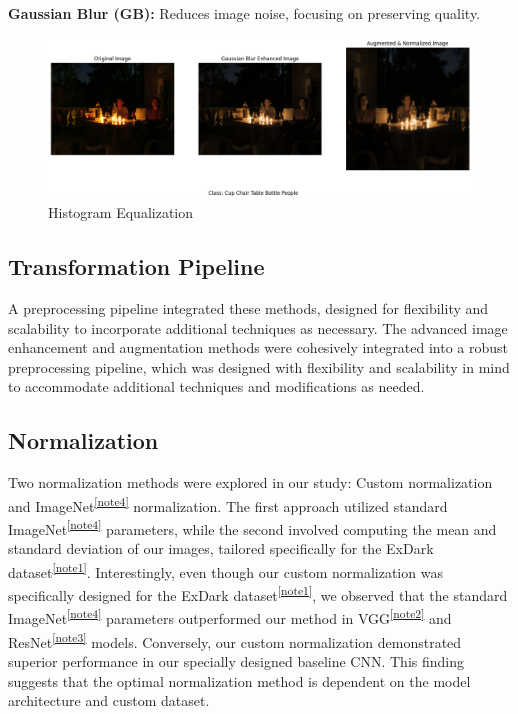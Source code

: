 \documentclass{article} %
\begin{document}
\textbf{Gaussian Blur (GB):} Reduces image noise, focusing on preserving quality.


\begin{figure}[h]
  \centering
  \includegraphics[width=\textwidth]{./figure+object/GB.png}
  \caption{Histogram Equalization}
  \label{fig:gb}
\end{figure}\hfill


\subsection{Transformation Pipeline}
A preprocessing pipeline integrated these methods, designed for flexibility and scalability to incorporate additional techniques as necessary. The advanced image enhancement and augmentation methods were cohesively integrated into a robust preprocessing pipeline, which was designed with flexibility and scalability in mind to accommodate additional techniques and modifications as needed.


\subsection{Normalization}
Two normalization methods were explored in our study: Custom normalization and ImageNet\textsuperscript{\ref{note4}}  normalization. The first approach utilized standard ImageNet\textsuperscript{\ref{note4}}  parameters, while the second involved computing the mean and standard deviation of our images, tailored specifically for the ExDark dataset\textsuperscript{\ref{note1}}. Interestingly, even though our custom normalization was specifically designed for the ExDark dataset\textsuperscript{\ref{note1}}, we observed that the standard ImageNet\textsuperscript{\ref{note4}}  parameters outperformed our method in VGG\textsuperscript{\ref{note2}} and ResNet\textsuperscript{\ref{note3}} models. Conversely, our custom normalization demonstrated superior performance in our specially designed baseline CNN. This finding suggests that the optimal normalization method is dependent on the model architecture and custom dataset.
\end{document}
